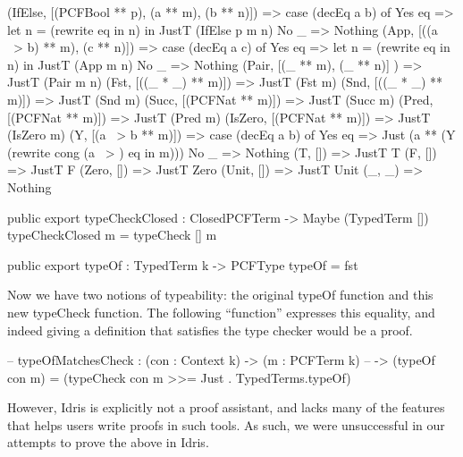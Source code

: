 \begin{code}
  (IfElse,  [(PCFBool ** p), (a ** m), (b ** n)]) 
      => case (decEq a b) of
            Yes eq => let n = (rewrite eq in n) in JustT (IfElse p m n)
            No  _  => Nothing
  (App,     [((a ~> b) ** m), (c ** n)])
      => case (decEq a c) of
            Yes eq => let n = (rewrite eq in n) in JustT (App m n)
            No  _  => Nothing
  (Pair,    [(_ ** m), (_ ** n)] )  => JustT (Pair m n)
  (Fst,     [((_ * _) ** m)])       => JustT (Fst m)
  (Snd,     [((_ * _) ** m)])       => JustT (Snd m)
  (Succ,    [(PCFNat ** m)])        => JustT (Succ m)
  (Pred,    [(PCFNat ** m)])        => JustT (Pred m)
  (IsZero,  [(PCFNat ** m)])        => JustT (IsZero m)
  (Y,       [(a ~> b ** m)])        => case (decEq a b) of
                                          Yes eq => Just (a ** (Y (rewrite cong (a ~> ) eq in m)))
                                          No  _  => Nothing
  (T,       [])                     => JustT T
  (F,       [])                     => JustT F
  (Zero,    [])                     => JustT Zero
  (Unit,    [])                     => JustT Unit
  (_, _)                            => Nothing
\end{code}

\begin{code}
public export
typeCheckClosed : ClosedPCFTerm -> Maybe (TypedTerm [])
typeCheckClosed m = typeCheck [] m
\end{code}

\begin{code}
public export
typeOf : TypedTerm k -> PCFType
typeOf = fst
\end{code}


Now we have two notions of typeability: the original typeOf function and this new typeCheck function.
The following ``function'' expresses this equality, and indeed giving a definition that satisfies the type checker would be a proof.
\begin{code}
-- typeOfMatchesCheck : (con : Context k) -> (m : PCFTerm k) 
--                        -> (typeOf con m) = (typeCheck con m >>= Just . TypedTerms.typeOf)
\end{code}
However, Idris is explicitly not a proof assistant, and lacks many of the features that helps users write proofs in such tools.
As such, we were unsuccessful in our attempts to prove the above in Idris.

